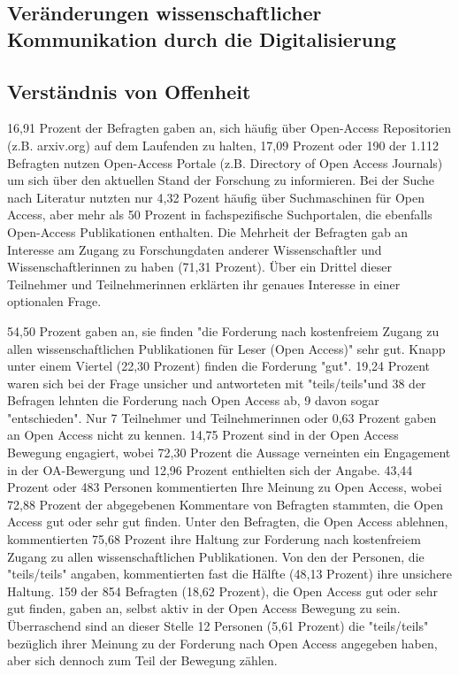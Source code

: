 \subsection{Veränderungen wissenschaftlicher Kommunikation durch die Digitalisierung}

\subsection{Verständnis von Offenheit}

16,91 Prozent der Befragten gaben an, sich häufig über Open-Access Repositorien (z.B. arxiv.org) auf dem Laufenden zu halten, 17,09 Prozent oder 190 der 1.112 Befragten nutzen Open-Access Portale (z.B. Directory of Open Access Journals) um sich über den aktuellen Stand der Forschung zu informieren. Bei der Suche nach Literatur nutzten nur 4,32 Pozent häufig über Suchmaschinen für Open Access, aber mehr als 50 Prozent in fachspezifische Suchportalen, die ebenfalls Open-Access Publikationen enthalten. Die Mehrheit der Befragten gab an Interesse am Zugang zu Forschungdaten anderer Wissenschaftler und Wissenschaftlerinnen zu haben (71,31 Prozent). Über ein Drittel dieser Teilnehmer und Teilnehmerinnen erklärten ihr genaues Interesse in einer optionalen Frage.

54,50 Prozent gaben an, sie finden "die Forderung nach kostenfreiem Zugang zu allen wissenschaftlichen Publikationen für Leser (Open Access)" sehr gut. Knapp unter einem Viertel (22,30 Prozent) finden die Forderung "gut". 19,24 Prozent waren sich bei der Frage unsicher und antworteten mit "teils/teils"und 38 der Befragen lehnten die Forderung nach Open Access ab, 9 davon sogar "entschieden". Nur 7 Teilnehmer und Teilnehmerinnen oder 0,63 Prozent gaben an Open Access nicht zu kennen. 14,75 Prozent sind in der Open Access Bewegung engagiert, wobei 72,30 Prozent die Aussage verneinten ein Engagement in der OA-Bewergung und 12,96 Prozent enthielten sich der Angabe. 43,44 Prozent oder 483 Personen kommentierten Ihre Meinung zu Open Access, wobei 72,88 Prozent der abgegebenen Kommentare von Befragten stammten, die Open Access gut oder sehr gut finden. Unter den Befragten, die Open Access ablehnen, kommentierten 75,68 Prozent ihre Haltung zur Forderung nach kostenfreiem Zugang zu allen wissenschaftlichen Publikationen. Von den der Personen, die "teils/teils" angaben, kommentierten fast die Hälfte (48,13 Prozent) ihre unsichere Haltung. 159 der 854 Befragten (18,62 Prozent), die Open Access gut oder sehr gut finden, gaben an, selbst aktiv in der Open Access Bewegung zu sein. Überraschend sind an dieser Stelle 12 Personen (5,61 Prozent) die "teils/teils" bezüglich ihrer Meinung zu der Forderung nach Open Access angegeben haben, aber sich dennoch zum Teil der Bewegung zählen.

